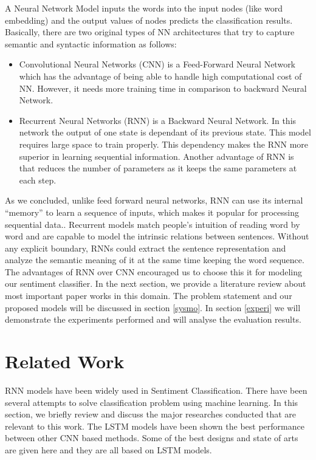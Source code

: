 \documentclass[journal]{IEEEtran}
\begin{document}
A Neural Network Model inputs the words into the input nodes (like word embedding) and the output values of nodes predicts the classification results. Basically, there are two original types of NN architectures that try to capture semantic and syntactic information as follows:
\begin{itemize}
  \item Convolutional Neural Networks (CNN) is a Feed-Forward Neural Network which has the advantage of being able to handle high computational cost of NN. However, it needs more training time in comparison to backward Neural Network.
  \item Recurrent Neural Networks (RNN) is a Backward Neural Network. In this network the output of one state is dependant of its previous state. This model requires large space to train properly. This dependency makes the RNN more superior in learning sequential information. Another advantage of RNN is that reduces the number of parameters as it keeps the same parameters at each step. 
  
\end{itemize}

\bigskip
As we concluded, unlike feed forward neural networks, RNN can use its internal “memory” to learn a sequence of inputs,	which	 makes it popular for processing sequential data.\cite{ZhangL}. Recurrent models match people’s intuition of reading word by word and are capable to model the intrinsic relations between sentences. Without any explicit boundary, RNNs could extract the sentence representation and analyze the semantic meaning of it at the same time keeping the word sequence.\cite{XuJ} The advantages of RNN over CNN encouraged us to choose this it for modeling our sentiment classifier. 
In the next section, we provide a literature review about most important paper works in this domain. The problem statement and our proposed models will be discussed in section \ref{sysmo}. In section \ref{experi} we will demonstrate the experiments performed and will analyse the evaluation results.


\section{Related Work}
\label{related}
RNN models have been widely used in Sentiment Classification. There have been several attempts to solve classification problem using machine learning. In this section, we briefly review and discuss the major researches conducted that are relevant to this work. The LSTM models have been shown the best performance between other CNN based methods\cite{Mabrouk}. Some of the best designs and state of arts are given here and they are all based on LSTM models.
\mdskip
\end{document}
